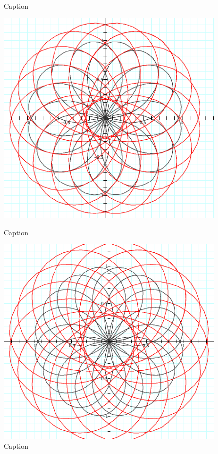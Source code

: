 \begin{figure}[H]
\begin{minipage}[b]{0.5\linewidth}
    \caption{Caption} 
    \label{fig:fig36}
    \vspace{4ex}
  \end{minipage} %
  \begin{minipage}[b]{0.5\linewidth}
    \centering
    \includegraphics[width=.9\linewidth]{parametric-polar-img/Fig 37.png} 
    \caption{Caption} 
    \label{fig:fig37}
    \vspace{4ex}
  \end{minipage} %
  \begin{minipage}[b]{0.5\linewidth}
    \centering
    \includegraphics[width=.9\linewidth]{parametric-polar-img/Fig 38.png} 
    \caption{Caption} 
    \label{fig:fig38}
    \vspace{4ex}
  \end{minipage} %
\end{figure}

